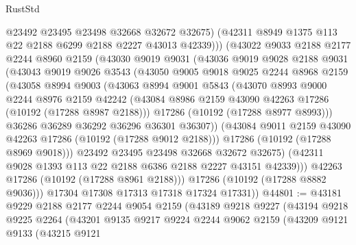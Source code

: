 \begin{lexlean}{RustStd}
\begin{coremodule}
                @23492
                @23495
                @23498
                @32668
                @32672
                @32675)
              (@42311 @8949 @1375 @113 @22 @2188 @6299 @2188 @2227 @43013 @42339)))
          (@43022
            @9033
            @2188
            @2177
            @2244
            @8960
            @2159
            (@43030
              @9019
              @9031
              (@43036
                @9019
                @9028
                @2188
                @9031
                (@43043
                  @9019
                  @9026
                  @3543
                  (@43050
                    @9005
                    @9018
                    @9025
                    @2244
                    @8968
                    @2159
                    (@43058
                      @8994
                      @9003
                      (@43063
                        @8994
                        @9001
                        @5843
                        (@43070
                          @8993
                          @9000
                          @2244
                          @8976
                          @2159
                          @42242
                          (@43084 @8986 @2159 @43090 @42263 @17286 (@10192 (@17288 @8987 @2188)))
                          @17286
                          (@10192 (@17288 @8977 @8993)))
                        @36286
                        @36289
                        @36292
                        @36296
                        @36301
                        @36307))
                    (@43084 @9011 @2159 @43090 @42263 @17286 (@10192 (@17288 @9012 @2188)))
                    @17286
                    (@10192 (@17288 @8969 @9018)))
                  @23492
                  @23495
                  @23498
                  @32668
                  @32672
                  @32675)
                (@42311 @9028 @1393 @113 @22 @2188 @6386 @2188 @2227 @43151 @42339)))
            @42263
            @17286
            (@10192 (@17288 @8961 @2188)))
          @17286
          (@10192 (@17288 @8882 @9036)))
        @17304
        @17308
        @17313
        @17318
        @17324
        @17331))
@44801 := @43181
    @9229
    @2188
    @2177
    @2244
    @9054
    @2159
    (@43189
      @9218
      @9227
      (@43194
        @9218
        @9225
        @2264
        (@43201
          @9135
          @9217
          @9224
          @2244
          @9062
          @2159
          (@43209
            @9121
            @9133
            (@43215
              @9121

\end{coremodule}
\end{lexlean}

